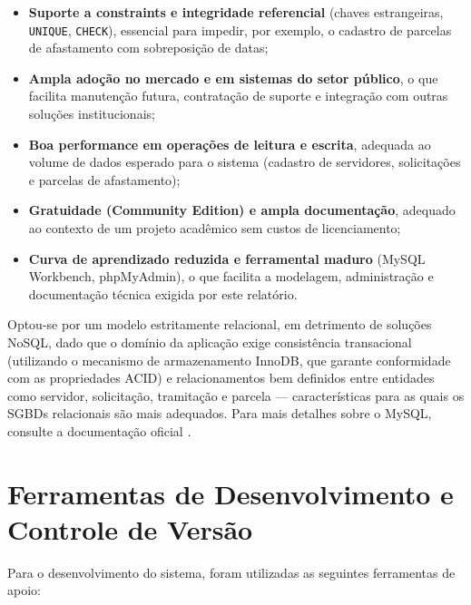 \begin{itemize}
\item \textbf{Suporte a constraints e integridade referencial} (chaves estrangeiras, \texttt{UNIQUE}, \texttt{CHECK}), essencial para impedir, por exemplo, o cadastro de parcelas de afastamento com sobreposição de datas;
\item \textbf{Ampla adoção no mercado e em sistemas do setor público}, o que facilita manutenção futura, contratação de suporte e integração com outras soluções institucionais;
\item \textbf{Boa performance em operações de leitura e escrita}, adequada ao volume de dados esperado para o sistema (cadastro de servidores, solicitações e parcelas de afastamento);
\item \textbf{Gratuidade (Community Edition) e ampla documentação}, adequado ao contexto de um projeto acadêmico sem custos de licenciamento;
\item \textbf{Curva de aprendizado reduzida e ferramental maduro} (MySQL Workbench, phpMyAdmin), o que facilita a modelagem, administração e documentação técnica exigida por este relatório.
\end{itemize}

Optou-se por um modelo estritamente relacional, em detrimento de soluções NoSQL, dado que o domínio da aplicação exige consistência transacional (utilizando o mecanismo de armazenamento InnoDB, que garante conformidade com as propriedades ACID) e relacionamentos bem definidos entre entidades como servidor, solicitação, tramitação e parcela — características para as quais os SGBDs relacionais são mais adequados. Para mais detalhes sobre o MySQL, consulte a documentação oficial \cite{mysql_manual}.

\section{Ferramentas de Desenvolvimento e Controle de Versão}

Para o desenvolvimento do sistema, foram utilizadas as seguintes ferramentas de apoio:

